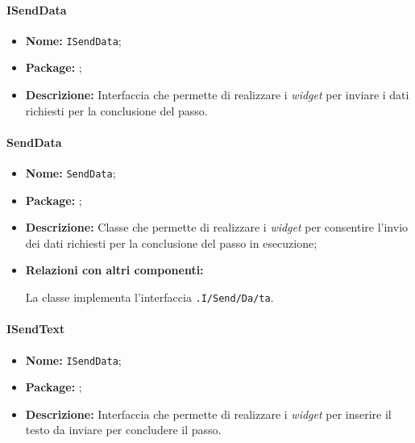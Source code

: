 \paragraph{ISendData}
\begin{itemize}
\item \textbf{Nome:} \texttt{ISendData};
\item \textbf{Package:} \texttt{\viewUser{}};
\item \textbf{Descrizione:} Interfaccia che permette di realizzare i \textit{widget} per inviare i dati richiesti per la conclusione del passo.
\end{itemize}

\paragraph{SendData}
\begin{flushleft}
\begin{itemize}
\item \textbf{Nome:} \texttt{SendData};
\item \textbf{Package:} \texttt{\viewUser{}};
\item \textbf{Descrizione:} Classe che permette di realizzare i \textit{widget} per consentire l'invio dei dati richiesti per la conclusione del passo in esecuzione;
\item \textbf{Relazioni con altri componenti:}
\begin{sloppypar}
La classe implementa l'interfaccia \texttt{\viewUser{}.I\fshyp{}Send\fshyp{}Da\fshyp{}ta}.
\end{sloppypar}
\end{itemize}
\end{flushleft}

\paragraph{ISendText}
\begin{itemize}
\item \textbf{Nome:} \texttt{ISendData};
\item \textbf{Package:} \texttt{\viewUser{}};
\item \textbf{Descrizione:} Interfaccia che permette di realizzare i \textit{widget} per inserire il testo da inviare per concludere il passo.
\end{itemize}

